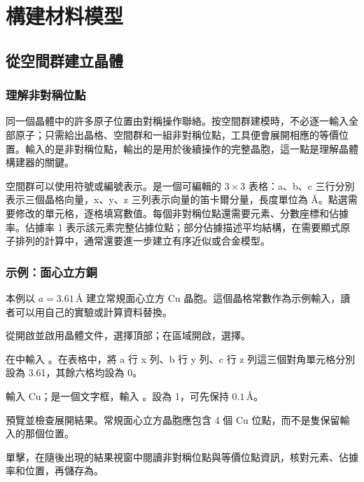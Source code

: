 \chapter{構建材料模型}\label{ch:advanced}


\section{從空間群建立晶體}

\subsection{理解非對稱位點}

同一個晶體中的許多原子位置由對稱操作聯絡。按空間群建模時，不必逐一輸入全部原子；只需給出晶格、空間群和一組非對稱位點，工具便會展開相應的等價位置。輸入的是非對稱位點，輸出的是用於後續操作的完整晶胞，這一點是理解晶體構建器的關鍵。

空間群可以使用符號或編號表示。是一個可編輯的 $3\times3$ 表格：a、b、c 三行分別表示三個晶格向量，x、y、z 三列表示向量的笛卡爾分量，長度單位為 \AA。點選需要修改的單元格，逐格填寫數值。每個非對稱位點還需要元素、分數座標和佔據率。佔據率 1 表示該元素完整佔據位點；部分佔據描述平均結構，在需要顯式原子排列的計算中，通常還要進一步建立有序近似或合金模型。

\subsection{示例：面心立方銅}

本例以 $a=3.61\,\text{\AA}$ 建立常規面心立方 Cu 晶胞。這個晶格常數作為示例輸入，讀者可以用自己的實驗或計算資料替換。

\begin{steps}
  \item 從開啟並啟用晶體文件，選擇頂部；在區域開啟，選擇。
  \item 在中輸入 。在表格中，將 a 行 x 列、b 行 y 列、c 行 z 列這三個對角單元格分別設為 3.61，其餘六格均設為 0。
  \item {}輸入 Cu；是一個文字框，輸入 。設為 1，可先保持 $0.1\,\text{\AA}$。
  \item 預覽並檢查展開結果。常規面心立方晶胞應包含 4 個 Cu 位點，而不是隻保留輸入的那個位置。
  \item 單擊，在隨後出現的結果視窗中閱讀非對稱位點與等價位點資訊，核對元素、佔據率和位置，再儲存為。
\end{steps}

